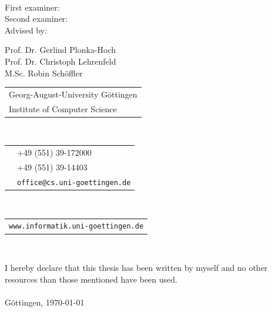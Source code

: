 \documentclass[a4paper, 11pt]{report}
\theoremstyle{definition}
\newcommand{\largetitlespace}{2.5em}
\begin{document}
\begin{titlepage}
\begin{center}
\begin{minipage}{.5\textwidth}
		\end{minipage}\\[\largetitlespace]
		\begin{minipage}{\textwidth}
			\centering
			\begin{minipage}{.32\textwidth}
				\flushright
				First examiner: \\
				Second examiner: \\
				Advised by:
			\end{minipage}
			\hspace{0.5em}
			\begin{minipage}{.45\textwidth}
				\flushleft
				Prof. Dr. Gerlind Plonka-Hoch\\
				Prof. Dr. Christoph Lehrenfeld\\
				M.Sc. Robin Schöffler
			\end{minipage}
		\end{minipage}
	\end{center}
\end{titlepage}
\pagebreak

\pagestyle{empty}
\restoregeometry
{}
\noindent
\begin{tabular}{l}
Georg-August-University Göttingen\\
Institute of Computer Science\\
\end{tabular}\\[1em]
\begin{tabular}{ll}
	\Telefon 	&+49 (551) 39-172000\\
	\FAX 		&+49 (551) 39-14403\\
	\Letter 	&\texttt{office@cs.uni-goettingen.de}\\
\end{tabular}\\[1em]
\begin{tabular}{l}
\texttt{www.informatik.uni-goettingen.de}\\
\end{tabular}\\[1em]
\pagebreak

\noindent I hereby declare that this thesis has been written by myself and no other resources than those mentioned have been used.\\[0.7em]
\\[0.5em]
Göttingen, \today \hspace{2em}
\pagebreak
\end{document}
